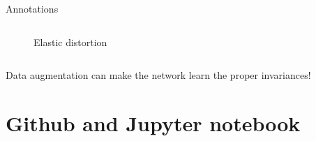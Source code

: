 \documentclass{beamer}
\begin{document}
\begin{frame}{Annotations}
\begin{columns}[T]
\begin{column}{.16\textwidth}
\begin{figure}[!ht]
\caption{Elastic distortion}
\label{fig: Elastic distortions}
\end{figure}
\end{column}%

\end{columns}

Data augmentation can make the network learn the proper invariances!
%

\end{frame}

\section{Github and Jupyter notebook}
\end{document}

